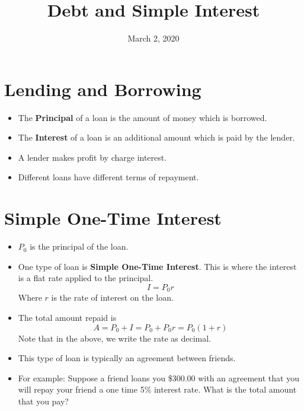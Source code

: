 \documentclass{article}
\title{Debt and Simple Interest}
\date{March 2, 2020}
\begin{document}
\maketitle

\section*{Lending and Borrowing}
\begin{itemize}
    \item The \textbf{Principal} of a loan is the amount of money
        which is borrowed.
    \item The \textbf{Interest} of a loan is an additional amount
        which is paid by the lender.
    \item A lender makes profit by charge interest.
    \item Different loans have different terms of repayment.
\end{itemize}

\section*{Simple One-Time Interest}
\begin{itemize}
    \item $P_0$ is the principal of the loan.
    \item One type of loan is \textbf{Simple One-Time Interest}.  This
        is where the interest is a flat rate applied to the principal.
    \[
        I=P_0r
    \]
    Where $r$ is the rate of interest on the loan.

    \item The total amount repaid is
    \[
        A=P_0 + I = P_0 + P_0r = P_0(1+r)
    \]
    Note that in the above, we write the rate as decimal.

    \item This type of loan is typically an agreement between friends.  

    \item For example: Suppose a friend loans you \$300.00 with an
    agreement that you will repay your friend a one time 5\% interest
    rate.  What is the total amount that you pay?
\end{itemize}
\end{document}
